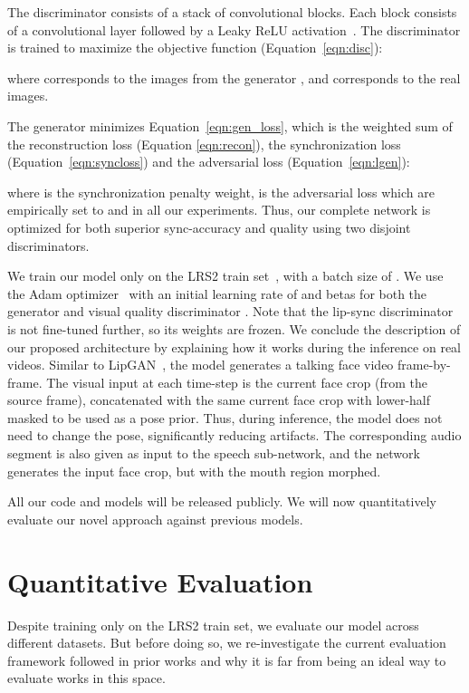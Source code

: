 \documentclass[sigconf]{acmart}
\begin{document}
The discriminator  consists of a stack of convolutional blocks. Each block consists of a convolutional layer followed by a Leaky ReLU activation~\cite{maas2013rectifier}. The discriminator is trained to maximize the objective function  (Equation~\ref{eqn:disc}):



where  corresponds to the images from the generator , and  corresponds to the real images.

The generator minimizes Equation~\ref{eqn:gen_loss}, which is the weighted sum of the reconstruction loss (Equation \ref{eqn:recon}), the synchronization loss (Equation~\ref{eqn:syncloss}) and the adversarial loss  (Equation~\ref{eqn:lgen}):



where  is the synchronization penalty weight,  is the adversarial loss which are empirically set to  and  in all our experiments. Thus, our complete network is optimized for both superior sync-accuracy and quality using two disjoint discriminators.  

We train our model only on the LRS2 train set~\cite{Afouras18c}, with a batch size of . We use the Adam optimizer~\cite{duchi2011adaptive} with an initial learning rate of  and betas  for both the generator and visual quality discriminator . Note that the lip-sync discriminator is not fine-tuned further, so its weights are frozen. We conclude the description of our proposed architecture by explaining how it works during the inference on real videos. Similar to LipGAN~\cite{kr2019towards}, the model generates a talking face video frame-by-frame. The visual input at each time-step is the current face crop (from the source frame), concatenated with the same current face crop with lower-half masked to be used as a pose prior. Thus, during inference, the model does not need to change the pose, significantly reducing artifacts. The corresponding audio segment is also given as input to the speech sub-network, and the network generates the input face crop, but with the mouth region morphed. 

All our code and models will be released publicly. We will now quantitatively evaluate our novel approach against previous models.

\section{Quantitative Evaluation}
\label{section:quanteval}
Despite training only on the LRS2 train set, we evaluate our model across  different datasets. But before doing so, we re-investigate the current evaluation framework followed in prior works and why it is far from being an ideal way to evaluate works in this space.
\end{document}
